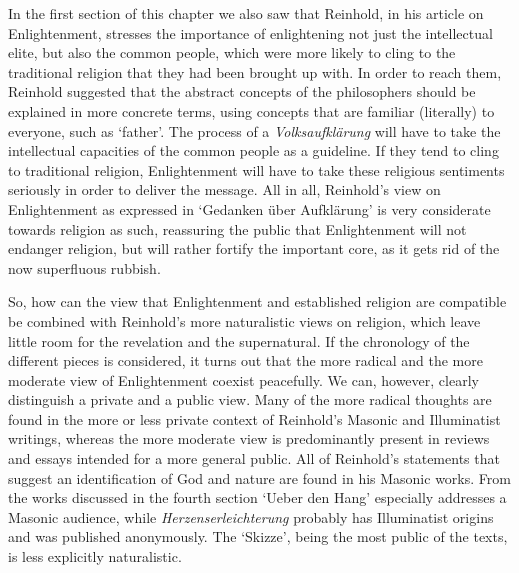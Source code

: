 In the first section of this chapter we also saw that Reinhold, in his article on Enlightenment, stresses the importance of enlightening not just the intellectual elite, but also the common people, which were more likely to cling to the traditional religion that they had been brought up with. In order to reach them, Reinhold suggested that the abstract concepts of the philosophers should be explained in more concrete terms, using concepts that are familiar (literally) to everyone, such as `father'. The process of a \textit{Volksaufkl\"{a}rung} will have to take the intellectual capacities of the common people as a guideline. If they tend to cling to traditional religion, Enlightenment will have to take these religious sentiments seriously in order to deliver the message. All in all, Reinhold's view on Enlightenment as expressed in `Gedanken \"{u}ber Aufkl\"{a}rung' is very considerate towards religion as such, reassuring the public that Enlightenment will not endanger religion, but will rather fortify the important core, as it gets rid of the now superfluous rubbish. 

 So, how can the view that Enlightenment and established religion are compatible be combined with Reinhold's more naturalistic views on religion, which leave little room for the revelation and the supernatural. If the chronology of the different pieces is considered, it turns out that the more radical and the more moderate view of Enlightenment coexist peacefully. We can, however, clearly distinguish a private and a public view. Many of the more radical thoughts are found in the more or less private context of Reinhold's Masonic and Illuminatist writings, whereas the more moderate view is predominantly present in reviews and essays intended for a more general public. All of Reinhold's statements that suggest an identification of God and nature are found in his Masonic works. From the works discussed in the fourth section `Ueber den Hang' especially addresses a Masonic audience, while \textit{Herzenserleichterung} probably has Illuminatist origins and was published anonymously. The `Skizze', being the most public of the texts, is less explicitly naturalistic. 

